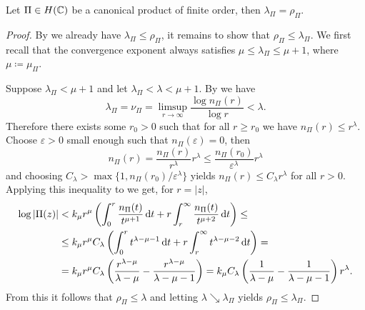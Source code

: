 \begin{theorem} \label{thm:exponent-of-convergence-weierstrass-product}
    Let $\Pi \in H(\mathbb{C})$ be a canonical product of finite order, then $\lambda_\Pi = \rho_\Pi$.
\end{theorem}

\begin{proof}
    By  we already have $\lambda_\Pi \leq \rho_\Pi$, it remains to show that $\rho_\Pi \leq \lambda_\Pi$. We first recall that the convergence exponent always satisfies $\mu \leq \lambda_\Pi \leq \mu + 1$, where $\mu \coloneqq \mu_\Pi$.
    
    Suppose $\lambda_\Pi < \mu + 1$ and let $\lambda_\Pi < \lambda < \mu + 1$. By  we have
    $$ \lambda_\Pi = \nu_\Pi = \limsup_{r \to \infty} \frac{\log n_\Pi(r)}{\log r} < \lambda. $$
    Therefore there exists some $r_0 > 0$ such that for all $r \geq r_0$ we have $n_\Pi(r) \leq r^\lambda$. Choose $\varepsilon > 0$ small enough such that $n_\Pi(\varepsilon) = 0$, then
    \begin{equation*}
        n_\Pi(r) = \frac{n_\Pi(r)}{r^\lambda} r^\lambda \leq \frac{n_\Pi(r_0)}{\varepsilon^\lambda} r^\lambda
    \end{equation*}
    and choosing $C_\lambda > \max \{ 1, n_\Pi(r_0) / \varepsilon^\lambda \}$ yields $n_\Pi(r) \leq C_\lambda r^\lambda$ for all $r > 0$. Applying this inequality to  we get, for $r = \vert z \vert$,
    \begin{align*}
        \log \vert \Pi(z) \vert &< k_\mu r^\mu \left( \int_0^r \frac{n_\Pi(t)}{t^{\mu + 1}} \mathop{}\!\mathrm{d} t + r \int_r^\infty \frac{n_\Pi(t)}{t^{\mu + 2}} \mathop{}\!\mathrm{d} t \right) \leq \\
        &\leq k_\mu r^\mu C_\lambda \left( \int_0^r t^{\lambda - \mu - 1} \mathop{}\!\mathrm{d} t + r \int_r^\infty t^{\lambda - \mu - 2} \mathop{}\!\mathrm{d} t \right) = \\
        &= k_\mu r^\mu C_\lambda \left( \frac{r^{\lambda - \mu}}{\lambda - \mu} - \frac{r^{\lambda - \mu}}{\lambda - \mu - 1} \right) = k_\mu C_\lambda \left( \frac{1}{\lambda - \mu} - \frac{1}{\lambda - \mu - 1} \right) r^\lambda.
    \end{align*}
    From this it follows that $\rho_\Pi \leq \lambda$ and letting $\lambda \searrow \lambda_\Pi$ yields $\rho_\Pi \leq \lambda_\Pi$.


\end{proof}
